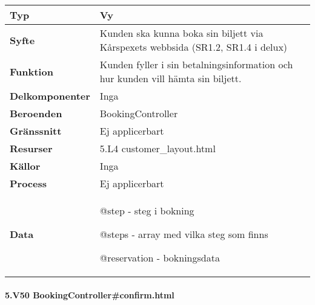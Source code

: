 \documentclass[a4paper, twoside, 11pt, titlepage]{article}
\begin{document}
			\begin {table} [ht] \begin{tabular} {  p{3.5cm} p{11.6cm} }
				\hline
				{\sffamily\textbf{Typ}} & {Vy} \\
				\hline
				{\sffamily\textbf{Syfte}} & {Kunden ska kunna boka sin biljett via Kårspexets webbsida (SR1.2, SR1.4 i delux)} \\
				\hline
				{\sffamily\textbf{Funktion}} & {Kunden fyller i sin betalningsinformation och hur kunden vill hämta sin biljett.} \\
				\hline
				{\sffamily\textbf{Delkomponenter}} & {Inga} \\
				\hline
				{\sffamily\textbf{Beroenden}} & {BookingController} \\
				\hline
				{\sffamily\textbf{Gränssnitt}} & {Ej applicerbart} \\
				\hline
				{\sffamily\textbf{Resurser}} & {5.L4 customer\_layout.html} \\
				\hline
				{\sffamily\textbf{Källor}} & {Inga} \\
				\hline
				{\sffamily\textbf{Process}} & {Ej applicerbart} \\
				\hline
				{\sffamily\textbf{Data}} & {@step - steg i bokning

@steps - array med vilka steg som finns

@reservation - bokningsdata} \\
				\hline
			\end{tabular} \end{table} \FloatBarrier


			\clearpage %
			\paragraph{5.V50 BookingController\#confirm.html}\
\end{document}
